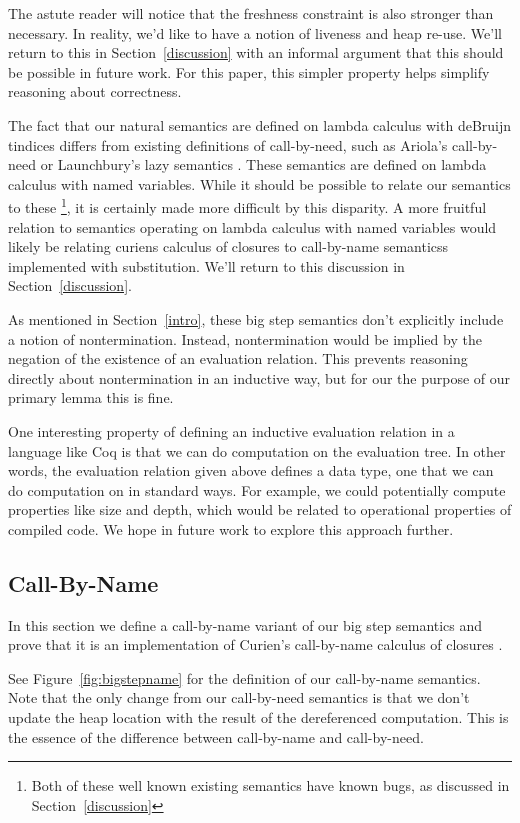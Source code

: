 The astute reader will notice that the freshness constraint is also stronger
than necessary. In reality, we'd like to have a notion of liveness and heap
re-use.  We'll return to this in Section~\ref{discussion} with an informal
argument that this should be possible in future work. For this paper, this
simpler property helps simplify reasoning about correctness.  

The fact that our natural semantics are defined on lambda calculus with deBruijn
tindices differs from existing definitions of call-by-need, such as Ariola's
call-by-need \cite{ariola} or Launchbury's lazy semantics \cite{launchbury}.
These semantics are defined on lambda calculus with named variables. While it
should be possible to relate our semantics to these \footnote{Both of these well
known existing semantics have known bugs, as discussed in
Section~\ref{discussion}}, it is certainly made more difficult by this
disparity. A more fruitful relation to semantics operating on lambda calculus
with named variables would likely be relating curiens calculus of closures to
call-by-name semanticss implemented with substitution. We'll return to this
discussion in Section~\ref{discussion}.

As mentioned in Section~\ref{intro}, these big step semantics don't explicitly
include a notion of nontermination. Instead, nontermination would be implied by
the negation of the existence of an evaluation relation. This prevents reasoning
directly about nontermination in an inductive way, but for our the purpose of
our primary lemma this is fine. 

One interesting property of defining an inductive evaluation relation in a
language like Coq is that we can do computation on the evaluation tree. In other
words, the evaluation relation given above defines a data type, one that we can
do computation on in standard ways. For example, we could potentially compute
properties like size and depth, which would be related to operational properties
of compiled code. We hope in future work to explore this approach further.

\subsection{Call-By-Name}

In this section we define a call-by-name variant of our big step semantics and
prove that it is an implementation of Curien's call-by-name calculus of
closures \cite{curien}. 

See Figure~\ref{fig:bigstepname} for the definition of our call-by-name
semantics. Note that the only change from our call-by-need semantics is that we
don't update the heap location with the result of the dereferenced computation.
This is the essence of the difference between call-by-name and call-by-need.

